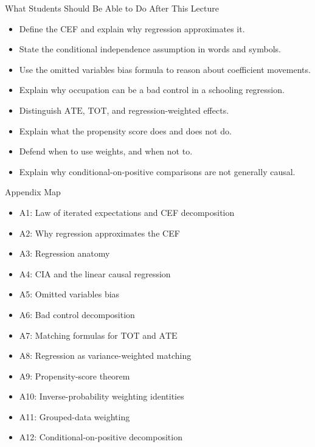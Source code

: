 \documentclass[11pt,aspectratio=169]{beamer}
\newcommand{\ATE}{\mathrm{ATE}}
\newcommand{\TOT}{\mathrm{TOT}}
\begin{document}
\begin{frame}{What Students Should Be Able to Do After This Lecture}
  \begin{itemize}
    \item Define the CEF and explain why regression approximates it.
    \item State the conditional independence assumption in words and symbols.
    \item Use the omitted variables bias formula to reason about coefficient movements.
    \item Explain why occupation can be a bad control in a schooling regression.
    \item Distinguish \(\ATE\), \(\TOT\), and regression-weighted effects.
    \item Explain what the propensity score does and does not do.
    \item Defend when to use weights, and when not to.
    \item Explain why conditional-on-positive comparisons are not generally causal.
  \end{itemize}
\end{frame}

\appendix

\begin{frame}{Appendix Map}
  \begin{itemize}
    \item A1: Law of iterated expectations and CEF decomposition
    \item A2: Why regression approximates the CEF
    \item A3: Regression anatomy
    \item A4: CIA and the linear causal regression
    \item A5: Omitted variables bias
    \item A6: Bad control decomposition
    \item A7: Matching formulas for \(\TOT\) and \(\ATE\)
    \item A8: Regression as variance-weighted matching
    \item A9: Propensity-score theorem
    \item A10: Inverse-probability weighting identities
    \item A11: Grouped-data weighting
    \item A12: Conditional-on-positive decomposition
  \end{itemize}
\end{frame}
\end{document}
